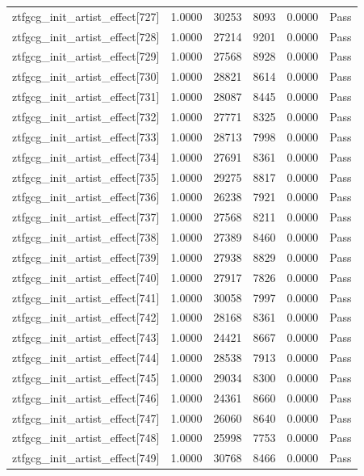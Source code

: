 \begin{table}[htbp]
\begin{tabular}{llrrll}
ztfgcg\_init\_artist\_effect[727] & 1.0000 & 30253 & 8093 & 0.0000 & Pass \\
ztfgcg\_init\_artist\_effect[728] & 1.0000 & 27214 & 9201 & 0.0000 & Pass \\
ztfgcg\_init\_artist\_effect[729] & 1.0000 & 27568 & 8928 & 0.0000 & Pass \\
ztfgcg\_init\_artist\_effect[730] & 1.0000 & 28821 & 8614 & 0.0000 & Pass \\
ztfgcg\_init\_artist\_effect[731] & 1.0000 & 28087 & 8445 & 0.0000 & Pass \\
ztfgcg\_init\_artist\_effect[732] & 1.0000 & 27771 & 8325 & 0.0000 & Pass \\
ztfgcg\_init\_artist\_effect[733] & 1.0000 & 28713 & 7998 & 0.0000 & Pass \\
ztfgcg\_init\_artist\_effect[734] & 1.0000 & 27691 & 8361 & 0.0000 & Pass \\
ztfgcg\_init\_artist\_effect[735] & 1.0000 & 29275 & 8817 & 0.0000 & Pass \\
ztfgcg\_init\_artist\_effect[736] & 1.0000 & 26238 & 7921 & 0.0000 & Pass \\
ztfgcg\_init\_artist\_effect[737] & 1.0000 & 27568 & 8211 & 0.0000 & Pass \\
ztfgcg\_init\_artist\_effect[738] & 1.0000 & 27389 & 8460 & 0.0000 & Pass \\
ztfgcg\_init\_artist\_effect[739] & 1.0000 & 27938 & 8829 & 0.0000 & Pass \\
ztfgcg\_init\_artist\_effect[740] & 1.0000 & 27917 & 7826 & 0.0000 & Pass \\
ztfgcg\_init\_artist\_effect[741] & 1.0000 & 30058 & 7997 & 0.0000 & Pass \\
ztfgcg\_init\_artist\_effect[742] & 1.0000 & 28168 & 8361 & 0.0000 & Pass \\
ztfgcg\_init\_artist\_effect[743] & 1.0000 & 24421 & 8667 & 0.0000 & Pass \\
ztfgcg\_init\_artist\_effect[744] & 1.0000 & 28538 & 7913 & 0.0000 & Pass \\
ztfgcg\_init\_artist\_effect[745] & 1.0000 & 29034 & 8300 & 0.0000 & Pass \\
ztfgcg\_init\_artist\_effect[746] & 1.0000 & 24361 & 8660 & 0.0000 & Pass \\
ztfgcg\_init\_artist\_effect[747] & 1.0000 & 26060 & 8640 & 0.0000 & Pass \\
ztfgcg\_init\_artist\_effect[748] & 1.0000 & 25998 & 7753 & 0.0000 & Pass \\
ztfgcg\_init\_artist\_effect[749] & 1.0000 & 30768 & 8466 & 0.0000 & Pass \\

\end{tabular}
\end{table}
